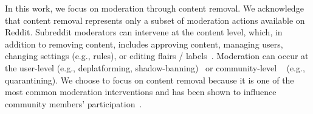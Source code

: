 In this work, we focus on moderation through content removal. We acknowledge that content removal represents only a subset of moderation actions available on Reddit. Subreddit moderators can intervene at the content level, which, in addition to removing content, includes approving content, managing users, changing settings (e.g., rules), or editing flairs / labels~\cite{li2022all}. Moderation can occur at the user-level (e.g., deplatforming, shadow-banning)~\cite{rogers2020deplatforming, myers2018censored} or community-level ~\cite{trujillo2022make,chandrasekharan2022quarantined} (e.g., quarantining). We choose to focus on content removal because it is one of the most common moderation interventions and has been shown to influence community members' participation~\cite{li2022all}.

